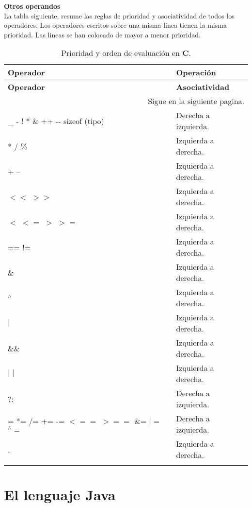 \documentclass[12pt, A4]{article}
\begin{document}
{{ \textbf{{{\Large } Otros operandos  }}\\
 La tabla  siguiente, resume las reglas de prioridad y asociatividad de todos los operadores. Los operadores escritos sobre una misma linea tienen la misma prioridad. Las lineas se han colocado de mayor a menor prioridad.


\begin{longtable}[h]{p{8cm} p{5cm}}
	\centering
	\hline
	
	\textbf{Operador} & \textbf{Operación} \\
	\hline\hline
	\endfirsthead
	
	\hline
	\textbf{Operador} & \textbf{Asociatividad} \\
	\hline\hline
	\endhead
	
	\multicolumn{2}{r}{Sigue en la siguiente pagina.}
	\endfoot
	
	\endlastfoot
	 ( ) [ ] . $-->$ & Izquierda a derecha. \\
	\rowcolor{gray!20} \_ - ! * \& ++ -\hspace{0.1 cm}- sizeof (tipo) & Derecha a izquierda. \\
	* / \%  & Izquierda a derecha. \\
	\rowcolor{gray!20} + -- & Izquierda a derecha. \\
	 $<<$ $>>$ & Izquierda a derecha. \\
	\rowcolor{gray!20} $<$ $<=$ $>$ $>=$ & Izquierda a derecha. \\
	 == != & Izquierda a derecha. \\
	\rowcolor{gray!20} \& & Izquierda a derecha. \\
	 $^{\wedge}$ & Izquierda a derecha. \\
	\rowcolor{gray!20} $\mid$ & Izquierda a derecha. \\
	 \&\& & Izquierda a derecha. \\
	\rowcolor{gray!20} $\mid\mid$ & Izquierda a derecha. \\
	 ?: & Derecha a izquierda. \\
	\rowcolor{gray!20} = *= /=  += -= $<==$ $>==$ \&= $\mid =$ $^{\wedge}=$ & Derecha a izquierda. \\
	 , & Izquierda a derecha.  \\  \hline
	\caption{Prioridad y orden de evaluación en \textbf{C}.}
\end{longtable}


		}
		
\newpage
	\section{El lenguaje Java}
	{
}}
\end{document}
